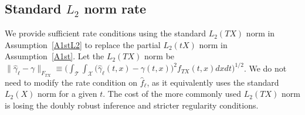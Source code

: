 \documentclass[lettersize, 12pt]{article}
\newtheorem{corollary}{Corollary}
\begin{document}
%





\subsection{Standard $L_2$ norm rate}
\label{SecL2}
We provide sufficient rate conditions using 
the standard $L_2(TX)$ norm in Assumption~\ref{A1stL2} to replace the partial $L_2(tX)$ norm in Assumption~\ref{A1st}.
Let the $L_2(TX)$ norm be 
$\|\hat\gamma_\ell-\gamma\|_{F_{TX}} \equiv \big(\int_\mathcal{T}\int_\mathcal{X}
\big(\hat\gamma_\ell(t,x) - \gamma(t,x) \big)^2  f_{TX}(t,x)dx dt\big)^{1/2}$.
We do not need to modify the rate condition on $\hat f_{\ell}$, as it equivalently uses the standard $L_2(X)$ norm for a given $t$. 
The cost of the more commonly used $L_2(TX)$ norm is losing the doubly robust inference and stricter regularity conditions.
\end{document}
